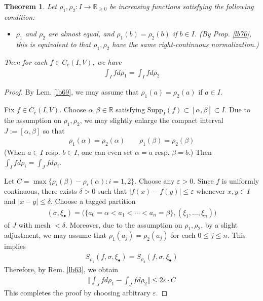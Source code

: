 \documentclass[12pt,b5paper,notitlepage]{article}
\theoremstyle{definition}
\theoremstyle{plain}
\newtheorem{thm}[df]{Theorem}
\newcommand{\blt}{\bullet}
\newcommand{\Rbb}{\mathbb R}
\newcommand{\Supp}{\mathrm{Supp}}
\newcommand{\eps}{\varepsilon}
\numberwithin{equation}{section}
\begin{document}
\begin{thm}\label{lb67}
Let $\rho_1,\rho_2:I\rightarrow\Rbb_{\geq0}$ be increasing functions satisfying the following condition:
\begin{itemize}
\item $\rho_1$ and $\rho_2$ are almost equal, and $\rho_1(b)=\rho_2(b)$ if $b\in I$. (By Prop. \ref{lb70}, this is equivalent to that $\rho_1,\rho_2$ have the same right-continuous normalization.)
\end{itemize}
Then for each $f\in C_c(I,V)$, we have
\begin{align*}
\int_I fd\rho_1=\int_I fd\rho_2
\end{align*}
\end{thm}



\begin{proof}
By Lem. \ref{lb69}, we may assume that $\rho_1(a)=\rho_2(a)$ if $a\in I$. 

Fix $f\in C_c(I,V)$. Choose $\alpha,\beta\in\Rbb$ satisfying $\Supp_I(f)\subset[\alpha,\beta]\subset I$. Due to the assumption on $\rho_1,\rho_2$, we may slightly enlarge the compact interval $J:=[\alpha,\beta]$ so that
\begin{align*}
\rho_1(\alpha)=\rho_2(\alpha)\qquad \rho_1(\beta)=\rho_2(\beta)
\end{align*}
(When $a\in I$ resp. $b\in I$, one can even set $\alpha=a$ resp. $\beta=b$.) Then $\int_I fd\rho_i=\int_J fd\rho_i$.


Let $C=\max\{\rho_i(\beta)-\rho_i(\alpha):i=1,2\}$. Choose any $\eps>0$. Since $f$ is uniformly continuous, there exists $\delta>0$ such that $|f(x)-f(y)|\leq\eps$ whenever $x,y\in I$ and $|x-y|\leq\delta$. Choose a tagged partition
\begin{align*}
(\sigma,\xi_\blt)=\big(\{a_0=\alpha<a_1<\cdots<a_n=\beta\},(\xi_1,\dots,\xi_n) \big)
\end{align*}
of $J$ with mesh $<\delta$. Moreover, due to the assumption on $\rho_1,\rho_2$, by a slight adjustment, we may assume that $\rho_1(a_j)=\rho_2(a_j)$ for each $0\leq j\leq n$. This implies
\begin{align*}
S_{\rho_1}(f,\sigma,\xi_\blt)=S_{\rho_2}(f,\sigma,\xi_\blt)
\end{align*}
Therefore, by Rem. \ref{lb63}, we obtain
\begin{align*}
\Big\Vert \int_J fd\rho_1-\int_J fd\rho_2\big\Vert\leq 2\eps\cdot C
\end{align*}
This completes the proof by choosing arbitrary $\eps$.
\end{proof}
\end{document}
